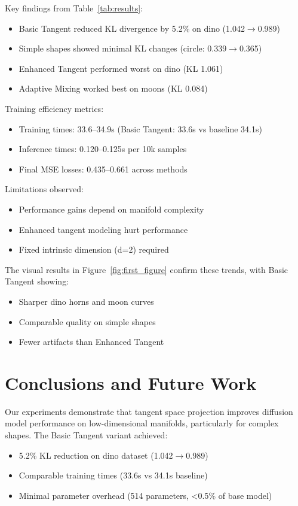 \documentclass[final]{iclr2024_conference}
\begin{document}
Key findings from Table~\ref{tab:results}:
\begin{itemize}
    \item Basic Tangent reduced KL divergence by 5.2\% on dino (1.042$\rightarrow$0.989)
    \item Simple shapes showed minimal KL changes (circle: 0.339$\rightarrow$0.365)
    \item Enhanced Tangent performed worst on dino (KL 1.061)
    \item Adaptive Mixing worked best on moons (KL 0.084)
\end{itemize}

Training efficiency metrics:
\begin{itemize}
    \item Training times: 33.6--34.9s (Basic Tangent: 33.6s vs baseline 34.1s)
    \item Inference times: 0.120--0.125s per 10k samples
    \item Final MSE losses: 0.435--0.661 across methods
\end{itemize}

Limitations observed:
\begin{itemize}
    \item Performance gains depend on manifold complexity
    \item Enhanced tangent modeling hurt performance
    \item Fixed intrinsic dimension (d=2) required
\end{itemize}

The visual results in Figure~\ref{fig:first_figure} confirm these trends, with Basic Tangent showing:
\begin{itemize}
    \item Sharper dino horns and moon curves
    \item Comparable quality on simple shapes
    \item Fewer artifacts than Enhanced Tangent
\end{itemize}

\section{Conclusions and Future Work}
\label{sec:conclusion}

Our experiments demonstrate that tangent space projection improves diffusion model performance on low-dimensional manifolds, particularly for complex shapes. The Basic Tangent variant achieved:
\begin{itemize}
    \item 5.2\% KL reduction on dino dataset (1.042$\rightarrow$0.989)
    \item Comparable training times (33.6s vs 34.1s baseline)
    \item Minimal parameter overhead (514 parameters, <0.5\% of base model)
\end{itemize}
\end{document}
